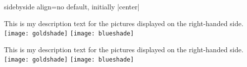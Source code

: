 \begin{docTcbKey}[][doc updated=2015-02-06]{sidebyside align}{=}{no default, initially |center|}
\begin{dispExample}
\begin{tcolorbox}[adjusted title=top seam,sidebyside align=top seam]
  This is my description text for the pictures displayed on the right-handed side.
  \tcblower
  \texttt{[image: goldshade]}%
  \texttt{[image: blueshade]}
\end{tcolorbox}

\begin{tcolorbox}[adjusted title=bottom seam,sidebyside align=bottom seam]
  This is my description text for the pictures displayed on the right-handed side.
  \tcblower
  \texttt{[image: goldshade]}%
  \texttt{[image: blueshade]}
\end{tcolorbox}
\end{dispExample}
\end{docTcbKey}